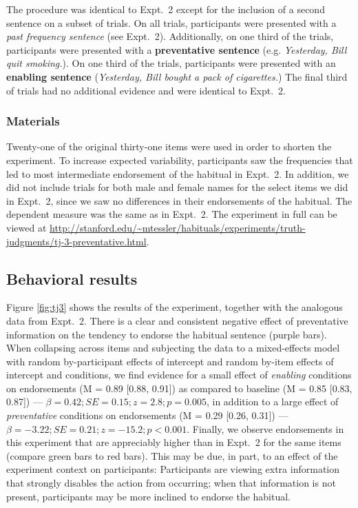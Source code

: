 \documentclass[10pt,letterpaper]{article}
\begin{document}
The procedure was identical to Expt.~2 except for the inclusion of a second sentence on a subset of trials. 
On all trials, participants were presented with a \emph{past frequency sentence} (see Expt.~2).
Additionally, on one third of the trials, participants were presented with a \textbf{preventative sentence} (e.g. \emph{Yesterday, Bill quit smoking.}). %
On one third of the trials, participants were presented with an \textbf{enabling sentence} (\emph{Yesterday, Bill bought a pack of cigarettes.}) %
The final third of trials had no additional evidence and were identical to Expt.~2. 

\subsubsection{Materials}

Twenty-one of the original thirty-one items were used in order to shorten the experiment.
To increase expected variability, participants saw the frequencies that led to most intermediate endorsement of the habitual in Expt.~2. 
In addition, we did not include trials for both male and female names for the select items we did in Expt.~2, since we saw no differences in their endorsements of the habitual.
The dependent measure was the same as in Expt.~2. 
The experiment in full can be viewed at \url{http://stanford.edu/~mtessler/habituals/experiments/truth-judgments/tj-3-preventative.html}.

\subsection{Behavioral results}

Figure \ref{fig:tj3} shows the results of the experiment, together with the analogous data from Expt.~2. 
There is a clear and consistent negative effect of preventative information on the tendency to endorse the habitual sentence (purple bars).
When collapsing across items and subjecting the data to a mixed-effects model with random by-participant effects of intercept and random by-item effects of intercept and conditions, we find evidence for a small effect of \emph{enabling} conditions on endorsements (M =  0.89 [0.88, 0.91]) as compared to baseline (M = 0.85 [0.83, 0.87]) --- $\beta = 0.42; SE = 0.15; z = 2.8; p = 0.005$, in addition to a large effect of \emph{preventative} conditions on endorsements (M = 0.29 [0.26, 0.31]) --- $\beta = -3.22; SE = 0.21; z = -15.2; p < 0.001$. 
Finally, we observe endorsements in this experiment that are appreciably higher than in Expt.~2 for the same items (compare green bars to red bars).
This may be due, in part, to an effect of the experiment context on participants: Participants are viewing extra information that strongly disables the action from occurring; when that information is not present, participants may be more inclined to endorse the habitual.
\end{document}
